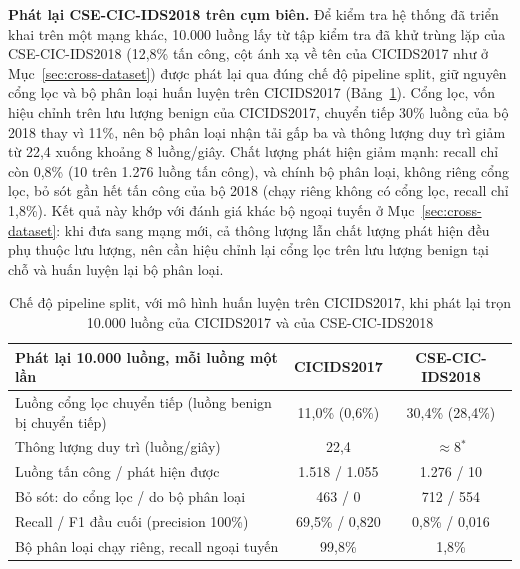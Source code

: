 \textbf{Phát lại CSE-CIC-IDS2018 trên cụm biên.} Để kiểm tra hệ thống đã triển khai trên một mạng khác, 10.000 luồng lấy từ tập kiểm tra đã khử trùng lặp của CSE-CIC-IDS2018 (12{,}8\% tấn công, cột ánh xạ về tên của CICIDS2017 như ở Mục~\ref{sec:cross-dataset}) được phát lại qua đúng chế độ pipeline split, giữ nguyên cổng lọc và bộ phân loại huấn luyện trên CICIDS2017 (Bảng~\ref{tab:edge_2018}). Cổng lọc, vốn hiệu chỉnh trên lưu lượng benign của CICIDS2017, chuyển tiếp 30\% luồng của bộ 2018 thay vì 11\%, nên bộ phân loại nhận tải gấp ba và thông lượng duy trì giảm từ 22{,}4 xuống khoảng 8 luồng/giây. Chất lượng phát hiện giảm mạnh: recall chỉ còn 0{,}8\% (10 trên 1.276 luồng tấn công), và chính bộ phân loại, không riêng cổng lọc, bỏ sót gần hết tấn công của bộ 2018 (chạy riêng không có cổng lọc, recall chỉ 1{,}8\%). Kết quả này khớp với đánh giá khác bộ ngoại tuyến ở Mục~\ref{sec:cross-dataset}: khi đưa sang mạng mới, cả thông lượng lẫn chất lượng phát hiện đều phụ thuộc lưu lượng, nên cần hiệu chỉnh lại cổng lọc trên lưu lượng benign tại chỗ và huấn luyện lại bộ phân loại.

\begin{table}[!t]
\centering
\caption[Pipeline split khi phát lại CICIDS2017 và CSE-CIC-IDS2018]{Chế độ pipeline split, với mô hình huấn luyện trên CICIDS2017, khi phát lại trọn 10.000 luồng của CICIDS2017 và của CSE-CIC-IDS2018}
\label{tab:edge_2018}
\footnotesize
\begin{tabular*}{\textwidth}{@{\extracolsep{\fill}}lcc@{}}
\toprule
\textbf{Phát lại 10.000 luồng, mỗi luồng một lần} & \textbf{CICIDS2017} & \textbf{CSE-CIC-IDS2018} \\ \midrule
Luồng cổng lọc chuyển tiếp (luồng benign bị chuyển tiếp) & 11{,}0\% (0{,}6\%) & 30{,}4\% (28{,}4\%) \\
Thông lượng duy trì (luồng/giây) & 22{,}4 & $\approx$8$^{*}$ \\
Luồng tấn công / phát hiện được & 1.518 / 1.055 & 1.276 / 10 \\
Bỏ sót: do cổng lọc / do bộ phân loại & 463 / 0 & 712 / 554 \\
Recall / F1 đầu cuối (precision 100\%) & 69{,}5\% / 0{,}820 & 0{,}8\% / 0{,}016 \\
Bộ phân loại chạy riêng, recall ngoại tuyến & 99{,}8\% & 1{,}8\% \\ \bottomrule
\end{tabular*}

\end{table}

